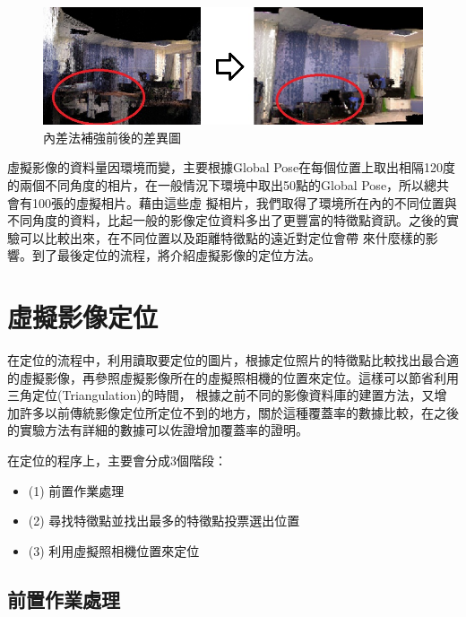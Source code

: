 	\begin{figure}
	\begin{center}
	  \includegraphics[width=1.0\textwidth]{figures/Depth_Interpolation.jpg}
	  \caption{內差法補強前後的差異圖}
	  \label{fig:interpolation}
	\end{center}
	\end{figure}	
	
	虛擬影像的資料量因環境而變，主要根據Global Pose在每個位置上取出相隔120度的兩個不同角度的相片，在一般情況下環境中取出50點的Global Pose，所以總共會有100張的虛擬相片。藉由這些虛
	擬相片，我們取得了環境所在內的不同位置與不同角度的資料，比起一般的影像定位資料多出了更豐富的特徵點資訊。之後的實驗可以比較出來，在不同位置以及距離特徵點的遠近對定位會帶
	來什麼樣的影響。到了最後定位的流程，將介紹虛擬影像的定位方法。

\section{虛擬影像定位}

%
	在定位的流程中，利用讀取要定位的圖片，根據定位照片的特徵點比較找出最合適的虛擬影像，再參照虛擬影像所在的虛擬照相機的位置來定位。這樣可以節省利用三角定位(Triangulation)的時間，
	根據之前不同的影像資料庫的建置方法，又增加許多以前傳統影像定位所定位不到的地方，關於這種覆蓋率的數據比較，在之後的實驗方法有詳細的數據可以佐證增加覆蓋率的證明。
	
	在定位的程序上，主要會分成3個階段：
		\begin{itemize}
			\item (1) 前置作業處理
    		\item (2) 尋找特徵點並找出最多的特徵點投票選出位置
    		\item (3) 利用虛擬照相機位置來定位
		\end{itemize} 
	
	
\subsection{前置作業處理}	

